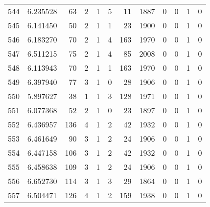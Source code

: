 \begin{tabular}{lrrrrrrrrrrr}
544 &  6.235528 &   63 &      2 &        1 &      5 &              11 &  1887 &               0 &               0 &               1 &               0 \\
545 &  6.141450 &   50 &      2 &        1 &      1 &              23 &  1900 &               0 &               0 &               1 &               0 \\
546 &  6.183270 &   70 &      2 &        1 &      4 &             163 &  1970 &               0 &               0 &               1 &               0 \\
547 &  6.511215 &   75 &      2 &        1 &      4 &              85 &  2008 &               0 &               0 &               1 &               0 \\
548 &  6.113943 &   70 &      2 &        1 &      1 &             163 &  1970 &               0 &               0 &               1 &               0 \\
549 &  6.397940 &   77 &      3 &        1 &      0 &              28 &  1906 &               0 &               0 &               1 &               0 \\
550 &  5.897627 &   38 &      1 &        1 &      3 &             128 &  1971 &               0 &               0 &               1 &               0 \\
551 &  6.077368 &   52 &      2 &        1 &      0 &              23 &  1897 &               0 &               0 &               1 &               0 \\
552 &  6.436957 &  136 &      4 &        1 &      2 &              42 &  1932 &               0 &               0 &               1 &               0 \\
553 &  6.461649 &   90 &      3 &        1 &      2 &              24 &  1906 &               0 &               0 &               1 &               0 \\
554 &  6.447158 &  106 &      3 &        1 &      2 &              42 &  1932 &               0 &               0 &               1 &               0 \\
555 &  6.458638 &  109 &      3 &        1 &      2 &              24 &  1906 &               0 &               0 &               1 &               0 \\
556 &  6.652730 &  114 &      3 &        1 &      3 &              29 &  1864 &               0 &               0 &               1 &               0 \\
557 &  6.504471 &  126 &      4 &        1 &      2 &             159 &  1938 &               0 &               0 &               1 &               0 \\

\end{tabular}
